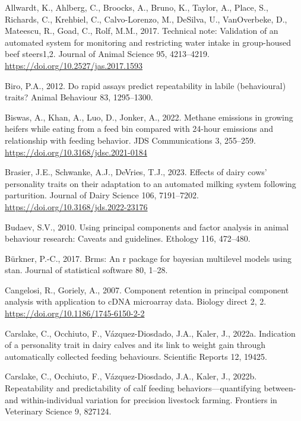 \documentclass[
]{article}
\newlength{\cslhangindent}
\newenvironment{CSLReferences}[2] %
 {\begin{list}{}{%
  \setlength{\itemindent}{0pt}
  \setlength{\leftmargin}{0pt}
  \setlength{\parsep}{0pt}
  \ifodd #1
   \setlength{\leftmargin}{\cslhangindent}
   \setlength{\itemindent}{-1\cslhangindent}
  \fi
  \setlength{\itemsep}{#2\baselineskip}}}
 {\end{list}}
\begin{document}
\label{refs}
\begin{CSLReferences}{1}{0}
Allwardt, K., Ahlberg, C., Broocks, A., Bruno, K., Taylor, A., Place,
S., Richards, C., Krehbiel, C., Calvo-Lorenzo, M., DeSilva, U.,
VanOverbeke, D., Mateescu, R., Goad, C., Rolf, M.M., 2017. Technical
note: Validation of an automated system for monitoring and restricting
water intake in group-housed beef steers1,2. Journal of Animal Science
95, 4213--4219. \url{https://doi.org/10.2527/jas.2017.1593}

Biro, P.A., 2012. Do rapid assays predict repeatability in labile
(behavioural) traits? Animal Behaviour 83, 1295--1300.

Biswas, A., Khan, A., Luo, D., Jonker, A., 2022. Methane emissions in
growing heifers while eating from a feed bin compared with 24-hour
emissions and relationship with feeding behavior. JDS Communications 3,
255--259. \url{https://doi.org/10.3168/jdsc.2021-0184}

Brasier, J.E., Schwanke, A.J., DeVries, T.J., 2023. Effects of dairy
cows' personality traits on their adaptation to an automated milking
system following parturition. Journal of Dairy Science 106, 7191--7202.
\url{https://doi.org/10.3168/jds.2022-23176}

Budaev, S.V., 2010. Using principal components and factor analysis in
animal behaviour research: Caveats and guidelines. Ethology 116,
472--480.

Bürkner, P.-C., 2017. Brms: An r package for bayesian multilevel models
using stan. Journal of statistical software 80, 1--28.

Cangelosi, R., Goriely, A., 2007. Component retention in principal
component analysis with application to cDNA microarray data. Biology
direct 2, 2. \url{https://doi.org/10.1186/1745-6150-2-2}

Carslake, C., Occhiuto, F., Vázquez-Diosdado, J.A., Kaler, J., 2022a.
Indication of a personality trait in dairy calves and its link to weight
gain through automatically collected feeding behaviours. Scientific
Reports 12, 19425.

Carslake, C., Occhiuto, F., Vázquez-Diosdado, J.A., Kaler, J., 2022b.
Repeatability and predictability of calf feeding behaviors---quantifying
between-and within-individual variation for precision livestock farming.
Frontiers in Veterinary Science 9, 827124.


\end{CSLReferences}
\end{document}
